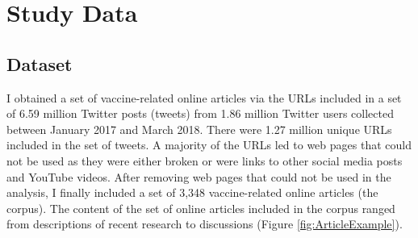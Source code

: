 \documentclass[a4paper,twoside,phd]{BYUPhys}
\begin{document}
\section{Study Data}
\label{sec:StudyData}

\subsection{Dataset}
\label{sec:Dataset}

I obtained a set of vaccine-related online articles via the URLs included in a set of 6.59 million Twitter posts (tweets) from 1.86 million Twitter users collected between January 2017 and March 2018. There were 1.27 million unique URLs included in the set of tweets. A majority of the URLs led to web pages that could not be used as they were either broken or were links to other social media posts and YouTube videos. After removing web pages that could not be used in the analysis, I finally included a set of 3,348 vaccine-related online articles (the corpus). The content of the set of online articles included in the corpus ranged from descriptions of recent research to discussions (Figure \ref{fig:ArticleExample}). \newline
\end{document}
